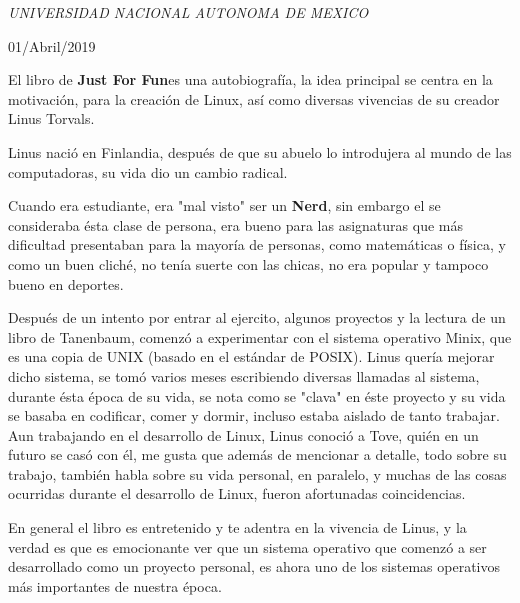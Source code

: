 \documentclass[a4paper, 11pt, oneside]{article}
\begin{document}
\begin{titlepage}
	\textit{UNIVERSIDAD NACIONAL AUTONOMA DE MEXICO} 
	
	
	
	
	
	\vspace{0.3\baselineskip} 
	
	01/Abril/2019 
	
	 

\end{titlepage}

El libro de \textbf{Just For Fun}es una autobiografía, la idea principal se centra en la motivación, para la creación de Linux, así como diversas vivencias de su creador Linus Torvals.

Linus nació en Finlandia, después de que su abuelo lo introdujera al mundo de las computadoras, su vida dio un cambio radical.

Cuando era estudiante, era "mal visto" ser un \textbf{Nerd}, sin embargo el se consideraba ésta clase de persona, era bueno para las asignaturas que más dificultad presentaban para la mayoría de personas, como matemáticas o física, y como un buen cliché, no tenía suerte con las chicas, no era popular y tampoco bueno en deportes.

Después de un intento por entrar al ejercito, algunos proyectos y la lectura de un libro de Tanenbaum, comenzó a experimentar con el sistema operativo Minix, que es una copia de UNIX (basado en el estándar de POSIX). Linus quería mejorar dicho sistema, se tomó varios meses escribiendo diversas llamadas al sistema, durante ésta época de su vida, se nota como se "clava" en éste proyecto y su vida se basaba en codificar, comer y dormir, incluso estaba aislado de tanto trabajar. Aun trabajando en el desarrollo de Linux, Linus conoció a Tove, quién en un futuro se casó con él, me gusta que además de mencionar a detalle, todo sobre su trabajo, también habla sobre su vida personal, en paralelo, y muchas de las cosas ocurridas durante el desarrollo de Linux, fueron afortunadas coincidencias.


En general el libro es entretenido y te adentra en la vivencia de Linus, y la verdad es que es emocionante ver que un sistema operativo que comenzó a ser desarrollado como un proyecto personal, es ahora uno de los sistemas operativos más importantes de nuestra época.
\end{document}

